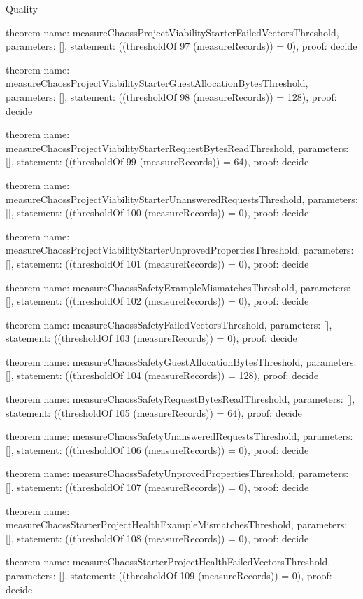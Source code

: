 \begin{lexlean}{Quality}
\begin{semanticmodule}
theorem{
  name: measureChaossProjectViabilityStarterFailedVectorsThreshold,
  parameters: [],
  statement: ((thresholdOf 97 (measureRecords)) = 0),
  proof: decide{}
}

theorem{
  name: measureChaossProjectViabilityStarterGuestAllocationBytesThreshold,
  parameters: [],
  statement: ((thresholdOf 98 (measureRecords)) = 128),
  proof: decide{}
}

theorem{
  name: measureChaossProjectViabilityStarterRequestBytesReadThreshold,
  parameters: [],
  statement: ((thresholdOf 99 (measureRecords)) = 64),
  proof: decide{}
}

theorem{
  name: measureChaossProjectViabilityStarterUnansweredRequestsThreshold,
  parameters: [],
  statement: ((thresholdOf 100 (measureRecords)) = 0),
  proof: decide{}
}

theorem{
  name: measureChaossProjectViabilityStarterUnprovedPropertiesThreshold,
  parameters: [],
  statement: ((thresholdOf 101 (measureRecords)) = 0),
  proof: decide{}
}

theorem{
  name: measureChaossSafetyExampleMismatchesThreshold,
  parameters: [],
  statement: ((thresholdOf 102 (measureRecords)) = 0),
  proof: decide{}
}

theorem{
  name: measureChaossSafetyFailedVectorsThreshold,
  parameters: [],
  statement: ((thresholdOf 103 (measureRecords)) = 0),
  proof: decide{}
}

theorem{
  name: measureChaossSafetyGuestAllocationBytesThreshold,
  parameters: [],
  statement: ((thresholdOf 104 (measureRecords)) = 128),
  proof: decide{}
}

theorem{
  name: measureChaossSafetyRequestBytesReadThreshold,
  parameters: [],
  statement: ((thresholdOf 105 (measureRecords)) = 64),
  proof: decide{}
}

theorem{
  name: measureChaossSafetyUnansweredRequestsThreshold,
  parameters: [],
  statement: ((thresholdOf 106 (measureRecords)) = 0),
  proof: decide{}
}

theorem{
  name: measureChaossSafetyUnprovedPropertiesThreshold,
  parameters: [],
  statement: ((thresholdOf 107 (measureRecords)) = 0),
  proof: decide{}
}

theorem{
  name: measureChaossStarterProjectHealthExampleMismatchesThreshold,
  parameters: [],
  statement: ((thresholdOf 108 (measureRecords)) = 0),
  proof: decide{}
}

theorem{
  name: measureChaossStarterProjectHealthFailedVectorsThreshold,
  parameters: [],
  statement: ((thresholdOf 109 (measureRecords)) = 0),
  proof: decide{}
}


\end{semanticmodule}
\end{lexlean}
